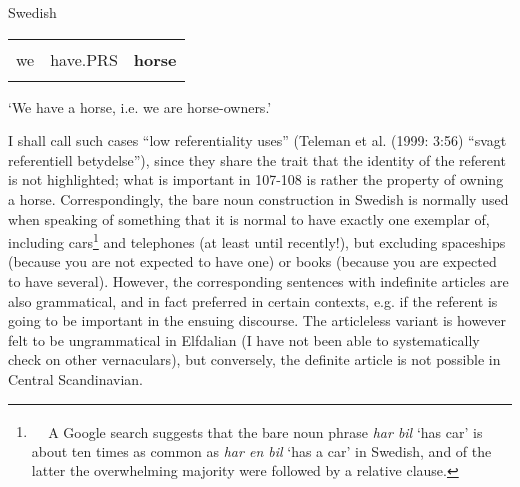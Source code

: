 \begin{listWWNumileveli}
\item {}

\begin{styleExample}
\label{bkm:Ref224102890}Swedish

\end{styleExample}

\end{listWWNumileveli}

\begin{tabular}{lll}
\lsptoprule
\multicolumn{3}{l}{Vi

}\\
we & have.PRS & {\bfseries horse}\\
\lspbottomrule
\end{tabular}

\begin{styleTranslation}
‘We have a horse, i.e. we are horse-owners.’

\end{styleTranslation}

\begin{styleBodyTextFirst}
I shall call such cases “low referentiality uses” (Teleman et al. (1999: 3:56) “svagt referentiell betydelse”), since they share the trait that the identity of the referent is not highlighted; what is important in 107{}-108 is rather the property of owning a horse. Correspondingly, the bare noun construction in Swedish is normally used when speaking of something that it is normal to have exactly one exemplar of, including cars\footnote{\textsuperscript{\ \ } A Google search suggests that the bare noun phrase \textit{har bil} ‘has car’ is about ten times as common as \textit{har en bil} ‘has a car’ in Swedish, and of the latter the overwhelming majority were followed by a relative clause. } and telephones (at least until recently!), but excluding spaceships (because you are not expected to have one) or books (because you are expected to have several). However, the corresponding sentences with indefinite articles are also grammatical, and in fact preferred in certain contexts, e.g. if the referent is going to be important in the ensuing discourse. The articleless variant is however felt to be ungrammatical in Elfdalian (I have not been able to systematically check on other vernaculars), but conversely, the definite article is not possible in Central Scandinavian. 

\end{styleBodyTextFirst}

